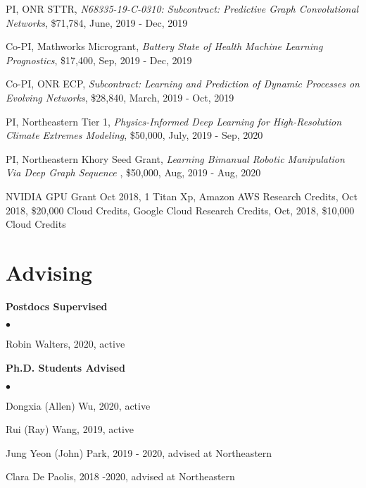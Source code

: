 \documentclass[margin,line]{res}
\newenvironment{list2}{
  \begin{list}{$\bullet$}{%
      \setlength{\itemsep}{0in}
      \setlength{\parsep}{0in} \setlength{\parskip}{0in}
      \setlength{\topsep}{0in} \setlength{\partopsep}{0in} 
      \setlength{\leftmargin}{0.2in}}}{\end{list}}
\begin{document}
\begin{resume}
\begin{enumerate}[label={[G\arabic*]}]
\item PI,  {ONR STTR}, \textit{N68335-19-C-0310: Subcontract: Predictive Graph Convolutional Networks},  \$71,784, June, 2019 - Dec, 2019


\item Co-PI,  {Mathworks Microgrant},    \textit{Battery State of Health Machine Learning Prognostics}, \$17,400,  Sep, 2019 - Dec, 2019
 
\item Co-PI,  {ONR ECP}, \textit{Subcontract: Learning and Prediction of Dynamic Processes on Evolving Networks}, \$28,840,  March, 2019 - Oct, 2019	

\item PI,  Northeastern Tier 1, \textit{Physics-Informed Deep Learning for High-Resolution Climate Extremes Modeling}, \$50,000, July, 2019 - Sep, 2020

\item PI, Northeastern Khory Seed Grant, \textit{Learning Bimanual Robotic Manipulation Via Deep Graph Sequence }, \$50,000,  Aug, 2019 - Aug, 2020	

\item NVIDIA GPU Grant Oct 2018, 1  Titan Xp,  Amazon AWS Research Credits, Oct  2018, \$20,000 Cloud Credits, Google Cloud Research Credits, Oct, 2018, \$10,000 Cloud Credits

\end{enumerate} 



\section{\sc Advising }
{\bf Postdocs Supervised} \\


\begin{list2}
\item Robin Walters, 2020, active 
\end{list2}




{\bf Ph.D. Students Advised} \\

\begin{list2}
\item Dongxia (Allen) Wu, 2020, active
\item Rui (Ray) Wang, 2019, active 
\item Jung Yeon (John) Park, 2019 - 2020,  advised at Northeastern
\item Clara De Paolis, 2018 -2020,  advised at Northeastern
\end{list2}



\end{resume}
\end{document}
